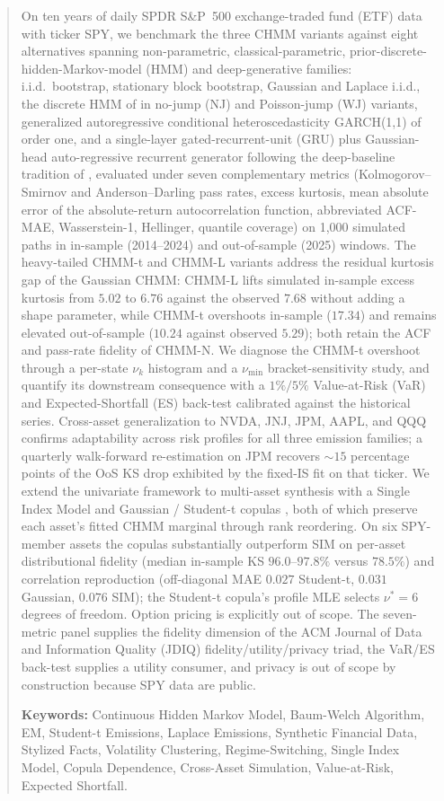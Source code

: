 \documentclass[11pt,a4paper]{article}
\begin{document}
\begin{abstract}
On ten years of daily SPDR S\&P~500 exchange-traded fund (ETF) data with ticker SPY, we benchmark the three CHMM variants against eight alternatives spanning non-parametric, classical-parametric, prior-discrete-hidden-Markov-model (HMM) and deep-generative families: i.i.d.\ bootstrap, stationary block bootstrap, Gaussian and Laplace i.i.d., the discrete HMM of \citet{alswaidan2026hybrid} in no-jump (NJ) and Poisson-jump (WJ) variants, generalized autoregressive conditional heteroscedasticity GARCH(1,1) of order one, and a single-layer gated-recurrent-unit (GRU) plus Gaussian-head auto-regressive recurrent generator following the deep-baseline tradition of \citet{yoon2019timegan}, evaluated under seven complementary metrics (Kolmogorov--Smirnov and Anderson--Darling pass rates, excess kurtosis, mean absolute error of the absolute-return autocorrelation function, abbreviated ACF-MAE, Wasserstein-1, Hellinger, quantile coverage) on 1{,}000 simulated paths in in-sample (2014--2024) and out-of-sample (2025) windows.
The heavy-tailed CHMM-t and CHMM-L variants address the residual kurtosis gap of the Gaussian CHMM: CHMM-L lifts simulated in-sample excess kurtosis from $5.02$ to $6.76$ against the observed $7.68$ without adding a shape parameter, while CHMM-t overshoots in-sample ($17.34$) and remains elevated out-of-sample ($10.24$ against observed $5.29$); both retain the ACF and pass-rate fidelity of CHMM-N.
We diagnose the CHMM-t overshoot through a per-state $\nu_k$ histogram and a $\nu_{\min}$ bracket-sensitivity study, and quantify its downstream consequence with a $1\%/5\%$ Value-at-Risk (VaR) and Expected-Shortfall (ES) back-test calibrated against the historical series.
Cross-asset generalization to NVDA, JNJ, JPM, AAPL, and QQQ confirms adaptability across risk profiles for all three emission families; a quarterly walk-forward re-estimation on JPM recovers $\sim 15$ percentage points of the OoS KS drop exhibited by the fixed-IS fit on that ticker.
We extend the univariate framework to multi-asset synthesis with a Single Index Model \citep{sharpe1963simplified} and Gaussian / Student-t copulas \citep{sklar1959fonctions, demarta2005tcopula}, both of which preserve each asset's fitted CHMM marginal through rank reordering.
On six SPY-member assets the copulas substantially outperform SIM on per-asset distributional fidelity (median in-sample KS $96.0$--$97.8\%$ versus $78.5\%$) and correlation reproduction (off-diagonal MAE $0.027$ Student-t, $0.031$ Gaussian, $0.076$ SIM); the Student-t copula's profile MLE selects $\nu^{*} = 6$ degrees of freedom.
Option pricing is explicitly out of scope.
The seven-metric panel supplies the fidelity dimension of the ACM Journal of Data and Information Quality (JDIQ) fidelity/utility/privacy triad, the VaR/ES back-test supplies a utility consumer, and privacy is out of scope by construction because SPY data are public.

\bigskip\noindent
\textbf{Keywords:} Continuous Hidden Markov Model, Baum-Welch Algorithm, EM, Student-t Emissions, Laplace Emissions, Synthetic Financial Data, Stylized Facts, Volatility Clustering, Regime-Switching, Single Index Model, Copula Dependence, Cross-Asset Simulation, Value-at-Risk, Expected Shortfall.
\end{abstract}
\end{document}

